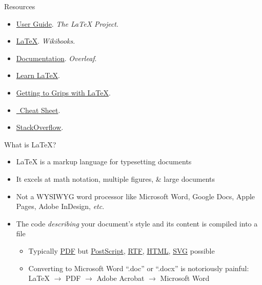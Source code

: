 \documentclass{cubeamer}
\begin{document}
\begin{frame}{Resources}
    \begin{itemize}
        \item \href{https://www.latex-project.org/help/documentation/usrguide.pdf}{User Guide}. \textit{The \LaTeX{} Project}.
        \item \href{https://en.wikibooks.org/wiki/LaTeX}{\LaTeX}. \textit{Wikibooks}.
        \item \href{https://www.overleaf.com/learn}{Documentation}. \textit{Overleaf}.
        \item \href{https://www.learnlatex.org/en/}{Learn \LaTeX}.
        \item \href{https://www.andy-roberts.net/writing/latex}{Getting to Grips with \LaTeX}.
        \item \href{http://wch.github.io/latexsheet/latexsheet.pdf}{\LaTeXe~Cheat Sheet}.
        \item \href{https://tex.stackexchange.com/}{StackOverflow}.
    \end{itemize}
\end{frame}

\begin{frame}{What is \LaTeX?}
    \begin{itemize}
        \item \LaTeX{} is a markup language for typesetting documents
        \item It excels at math notation, multiple figures, \& large documents
        \item Not a WYSIWYG word processor like Microsoft Word, Google Docs, Apple Pages, Adobe InDesign, \textit{etc}.
        \item The code \textit{describing} your document's style and its content is compiled into a file
        \begin{itemize}
            \item Typically \href{https://en.wikipedia.org/wiki/PDF}{PDF} but \href{https://en.wikipedia.org/wiki/PostScript}{PostScript}, \href{https://en.wikipedia.org/wiki/Rich_Text_Format}{RTF}, \href{https://en.wikipedia.org/wiki/HTML}{HTML}, \href{https://en.wikipedia.org/wiki/Scalable_Vector_Graphics}{SVG} possible
            \item Converting to Microsoft Word ``.doc'' or ``.docx'' is notoriously painful: \LaTeX{} $\rightarrow$ PDF $\rightarrow$ Adobe Acrobat $\rightarrow$ Microsoft Word
        \end{itemize}
    \end{itemize}
\end{frame}
\end{document}
